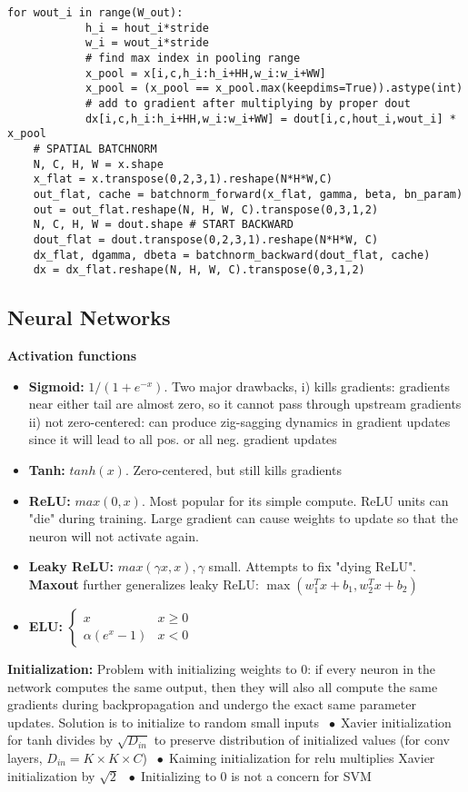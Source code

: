 \documentclass[9pt]{extarticle}
\newcommand*\bspace{$\; \bullet \;$}
\begin{document}
\begin{lstlisting}[multicols=2]
          for wout_i in range(W_out):
            h_i = hout_i*stride
            w_i = wout_i*stride
            # find max index in pooling range
            x_pool = x[i,c,h_i:h_i+HH,w_i:w_i+WW]
            x_pool = (x_pool == x_pool.max(keepdims=True)).astype(int)
            # add to gradient after multiplying by proper dout
            dx[i,c,h_i:h_i+HH,w_i:w_i+WW] = dout[i,c,hout_i,wout_i] * x_pool
    # SPATIAL BATCHNORM
    N, C, H, W = x.shape
    x_flat = x.transpose(0,2,3,1).reshape(N*H*W,C)
    out_flat, cache = batchnorm_forward(x_flat, gamma, beta, bn_param)
    out = out_flat.reshape(N, H, W, C).transpose(0,3,1,2)
    N, C, H, W = dout.shape # START BACKWARD
    dout_flat = dout.transpose(0,2,3,1).reshape(N*H*W, C)
    dx_flat, dgamma, dbeta = batchnorm_backward(dout_flat, cache)
    dx = dx_flat.reshape(N, H, W, C).transpose(0,3,1,2)
\end{lstlisting}


\subsection{Neural Networks}
\textbf{Activation functions}
\begin{itemize}
    \item \textbf{Sigmoid:} $1 / (1 + e^{-x})$. Two major drawbacks,  i) kills gradients: gradients near either tail are almost zero, so it cannot pass through upstream gradients ii) not zero-centered: can produce zig-sagging dynamics in gradient updates since it will lead to all pos. or all neg. gradient updates
    \item \textbf{Tanh:} $tanh(x)$. Zero-centered, but still kills gradients
    \item \textbf{ReLU:} $max(0, x)$. Most popular for its simple compute. ReLU units can "die" during training. Large gradient can cause weights to update so that the neuron will not activate again. 
    \item \textbf{Leaky ReLU:} $max(\gamma x, x), \gamma$ small. Attempts to fix "dying ReLU". \textbf{Maxout} further generalizes leaky ReLU: $\max(w_1^Tx + b_1, w_2^Tx + b_2)$
    \item \textbf{ELU:} $\begin{cases} x & x \geq 0 \\ \alpha(e^x-1) & x < 0\end{cases}$
\end{itemize}
\textbf{Initialization:} Problem with initializing weights to 0: if every neuron in the network computes the same output, then they will also all compute the same gradients during backpropagation and undergo the exact same parameter updates. Solution is to initialize to random small inputs \bspace Xavier initialization for tanh divides by $\sqrt{D_{in}}$ to preserve distribution of initialized values (for conv layers, $D_{in} = K\times K\times C$) \bspace Kaiming initialization for relu multiplies Xavier initialization by $\sqrt{2}$ \bspace Initializing to 0 is not a concern for SVM\\
\end{document}
